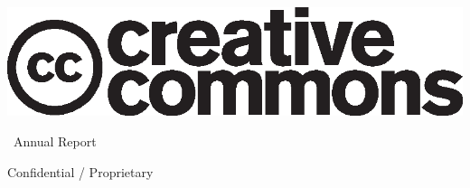 \begin{titlepage}
  \begin{center}
    \vspace*{1cm}

    \includegraphics[width=1.0\textwidth]{../images/cc.logo.eps}
    \vspace{46pt}

    \fontsize{38pt}{46pt}
    \selectfont
    \the\year\ Annual Report

    \vfill

    \normalfont
    \small
    Confidential / Proprietary

  \end{center}
\end{titlepage}
